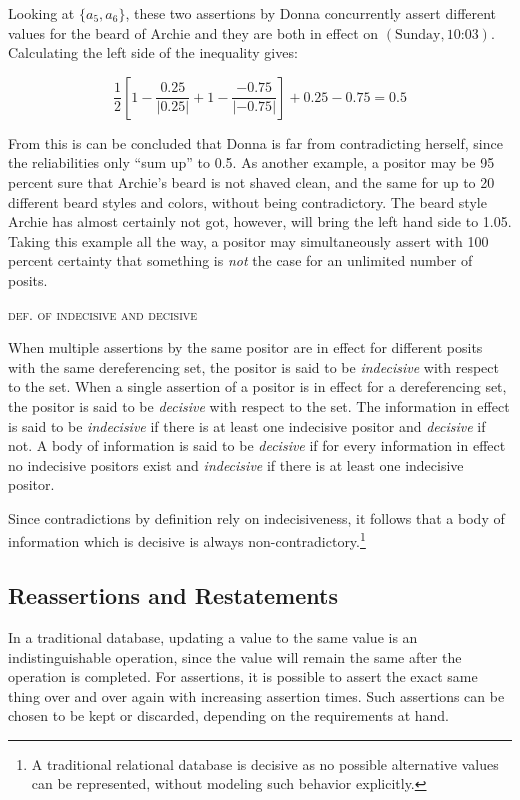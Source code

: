 \documentclass[sfsidenotes,nobib,twoside,symmetric]{tufte-handout}
\newcounter{majorcount}
\newcommand{\deffy}[3]{
	\vspace{2ex}
	\refstepcounter{majorcount} 
	\noindent\textsc{#1}%
	\\\begin{small}
	\noindent #2%
	\label{Def:#3}
	\end{small}
	\vspace{2ex}
}
\begin{document}
Looking at $\{a_5, a_6\}$, these two assertions by Donna concurrently assert different values for the beard of Archie and they are both in effect on $(\textrm{Sunday}, \textrm{10:03})$. Calculating the left side of the inequality gives:
\begin{small}
$$\frac{1}{2}\left[1-\frac{0.25}{|0.25|}+1-\frac{-0.75}{|-0.75|}\right] + 0.25 - 0.75 = 0.5$$
\end{small}

From this is can be concluded that Donna is far from contradicting herself, since the reliabilities only \enquote{sum up} to 0.5. As another example, a positor may be 95 percent sure that Archie's beard is not shaved clean, and the same for up to 20 different beard styles and colors, without being contradictory. The  beard style Archie has almost certainly not got, however, will bring the left hand side to 1.05. Taking this example all the way, a positor may simultaneously assert with 100 percent certainty that something is \emph{not} the case for an unlimited number of posits.

\deffy{def. of indecisive and decisive}{%
When multiple assertions by the same positor are in effect for different posits with the same dereferencing set, the positor is said to be \emph{indecisive} with respect to the set. When a single assertion of a positor is in effect for a dereferencing set, the positor is said to be \emph{decisive} with respect to the set. The information in effect is said to be \emph{indecisive} if there is at least one indecisive positor and \emph{decisive} if not. A body of information is said to be \emph{decisive} if for every information in effect no indecisive positors exist and \emph{indecisive} if there is at least one indecisive positor.
}{decisiveness}

Since contradictions by definition rely on indecisiveness, it follows that a body of information which is decisive is always non-contradictory.\footnote{A traditional relational database is decisive as no possible alternative values can be represented, without modeling such behavior explicitly.}

\subsection{Reassertions and Restatements}
%
In a traditional database, updating a value to the same value is an indistinguishable operation, since the value will remain the same after the operation is completed. For assertions, it is possible to assert the exact same thing over and over again with increasing assertion times. Such assertions can be chosen to be kept or discarded, depending on the requirements at hand. 
\end{document}
